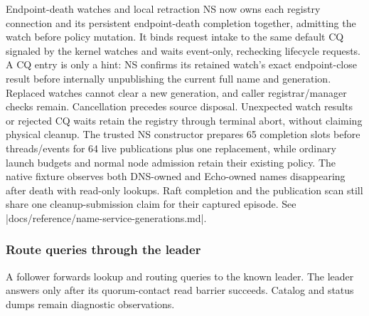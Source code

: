 \begin{implementationdetail}{Endpoint-death watches and local retraction}
NS now owns each registry connection and
its persistent endpoint-death completion together, admitting the watch before
policy mutation. It binds request intake to the same default CQ signaled by
the kernel watches and waits event-only, rechecking lifecycle requests. A CQ
entry is only a hint: NS confirms its retained watch's exact endpoint-close
result before internally unpublishing the current full name and generation.
Replaced watches cannot clear a new generation, and caller registrar/manager
checks remain. Cancellation precedes source disposal. Unexpected watch results
or rejected CQ waits retain the registry through terminal abort, without
claiming physical cleanup. The trusted NS constructor prepares 65 completion
slots before threads/events for 64 live publications plus one replacement, while
ordinary launch budgets and normal node admission retain their existing policy.
The native fixture observes both DNS-owned and Echo-owned names disappearing
after death with read-only lookups. Raft completion and the publication scan
still share one cleanup-submission claim for their captured episode. See
\repofile|docs/reference/name-service-generations.md|.
\end{implementationdetail}

\subsubsection{Route queries through the leader}

A follower forwards lookup and routing queries to the known leader. The leader
answers only after its quorum-contact read barrier succeeds. Catalog and status
dumps remain diagnostic observations.

